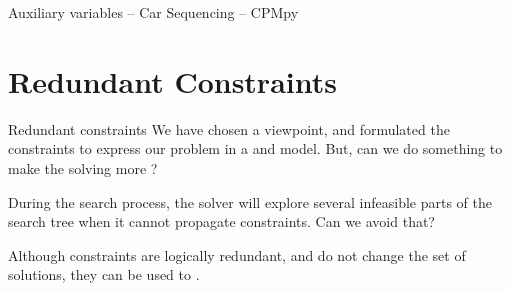 \documentclass{cons-beamer}
\begin{document}
\begin{flashcardcpmpy}
  \begin{frame}{Auxiliary variables -- Car Sequencing -- CPMpy}
    \begin{example}
      
    \end{example}
  \end{frame}
\end{flashcardcpmpy}

\section{Redundant Constraints}

\begin{frame}{Redundant constraints}
  We have chosen a viewpoint, and formulated the constraints to express our problem in a  and  model. But, can we do something to make the solving more ?
  \parBreak

  During the search process, the solver will explore several infeasible parts of the search tree when it cannot propagate constraints. Can we avoid that?
  \parBreak

  \redundantConstraintDefinition
  \parBreak

  Although  constraints are logically redundant,
  and do not change the set of solutions, they can be used to
  .
\end{frame}
\end{document}
